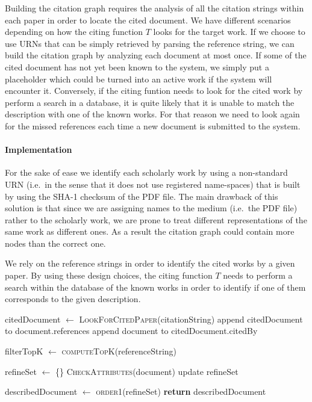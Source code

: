 Building the citation graph requires the analysis of all the citation strings within each paper in order to locate the cited document. We have different scenarios depending on how the citing function $T$ looks for the target work. If we choose to use URNs that can be simply retrieved by parsing the reference string, we can build the citation graph by analyzing each document at most once. If some of the cited document has not yet been known to the system, we simply put a placeholder which could be turned into an active work if the system will encounter it. Conversely, if the citing funtion needs to look for the cited work by perform a search in a database, it is quite likely that it is unable to match the description with one of the known works. For that reason we need to look again for the missed references each time a new document is submitted to the system.

\paragraph{Implementation} For the sake of ease we identify each scholarly work by using a non-standard URN (i.e.\ in the sense that it does not use registered name-spaces) that is built by using the SHA-1 checksum of the PDF file. The main drawback of this solution is that since we are assigning names to the medium (i.e.\ the PDF file) rather to the scholarly work, we are prone to treat different representations of the same work as different ones. As a result the citation graph could contain more nodes than the correct one.

We rely on the reference strings in order to identify the cited works by a given paper. By using these design choices, the citing function $T$ needs to perform a search within the database of the known works in order to identify if one of them corresponds to the given description.

\begin{algorithm}[t]
\caption{Citation graph building by using reference strings}\label{alg:citation_graph_building}
\begin{algorithmic}[1]
		\State citedDocument $\gets$ \textsc{LookForCitedPaper}(citationString)
			\State append citedDocument to document.references
			\State append document to citedDocument.citedBy
		\EndIf
	\EndFor
\EndFor
\EndProcedure
\Statex
{}

\State filterTopK $\gets$ \textsc{computeTopK}(referenceString)

\State refineSet $\gets$ \{\}
	\State \textsc{CheckAttributes}(document)
	\State update refineSet
\EndFor

\State describedDocument $\gets$ \textsc{order1}(refineSet)
\State \textbf{return} describedDocument

\EndFunction
\end{algorithmic}
\end{algorithm}

